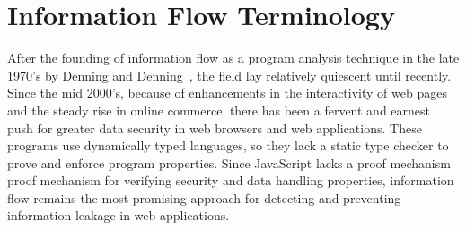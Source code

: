 \chapter{Information Flow Terminology}
\label{ch:terminology}

\begin{comment}
\begin{table*}
\centering
\begin{tabular}{ccccm{2.5cm}}
\toprule
Category & Descriptor & Example & Flow & Required Analysis \\
\midrule[\heavyrulewidth]
\multirow{3}{*}{Explicit} & Direct &
\begin{js-embed}
b = a
\end{js-embed} & a $\rightarrow$ b & Dataflow\\
\cmidrule(r){2-5} & Indirect &
\begin{js-embed}
b = foo(_, a, _)
c = bar(_, b, _)
\end{js-embed}
& a $\rightarrow$ c & Dataflow (transitive) \\
\hline
\multirow{7}{*}{Implicit} & Active &
\begin{js-embed}
a = true
b = 0
if (a)
   b = 1
else
   ...
\end{js-embed}
& a $\rightarrow$ b & Control Flow (dynamic)\\
\cmidrule(r){2-5} & Passive &
\begin{js-embed}
a = true
c = 0
if (a)
   ...
else
   c = 1
\end{js-embed}
& a $\rightarrow$ c & Control Flow (static)\\
\bottomrule
\end{tabular}
\caption{Terminology of Information Flows.}
\label{table:terminology}
\end{table*}
\end{comment}

After the founding of information flow as a program analysis technique in the late 1970's by Denning and Denning~\cite{denning.denning+77}, the field lay relatively quiescent until recently.
Since the mid 2000's, because of enhancements in the interactivity of web pages and the steady rise in online commerce, there has been a fervent and earnest push for greater data security in web browsers and web applications.
These programs use dynamically typed languages, so they lack a static type checker to prove and enforce program properties.
Since JavaScript lacks a proof mechanism proof mechanism for verifying security and data handling properties, information flow remains the most promising approach for detecting and preventing information leakage in web applications.

